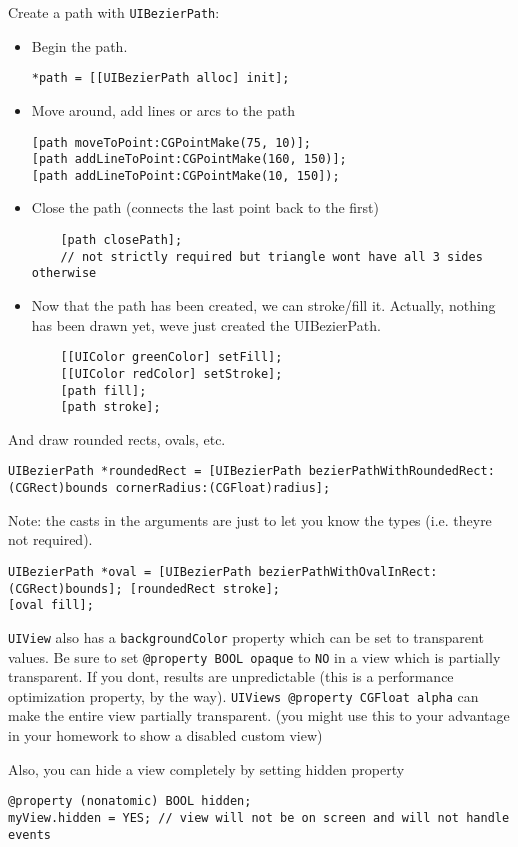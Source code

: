 \documentclass[12pt]{article}
\newcommand{\co}{\texttt}
\begin{document}
Create a path with \co{UIBezierPath}:
\begin{itemize}
	\item Begin the path.
		\begin{lstlisting}
*path = [[UIBezierPath alloc] init];
		\end{lstlisting}
	\item Move around, add lines or arcs to the path
	\begin{lstlisting}
[path moveToPoint:CGPointMake(75, 10)];
[path addLineToPoint:CGPointMake(160, 150)];
[path addLineToPoint:CGPointMake(10, 150]);
	\end{lstlisting}
	\item Close the path (connects the last point back to the first) 
	\begin{lstlisting}
	[path closePath]; 
	// not strictly required but triangle wont have all 3 sides otherwise
	\end{lstlisting}
	\item Now that the path has been created, we can stroke/fill it. Actually, nothing has been drawn yet, weve just created the UIBezierPath. 
	\begin{lstlisting}
	[[UIColor greenColor] setFill];
	[[UIColor redColor] setStroke];
	[path fill]; 
	[path stroke];
	\end{lstlisting}
\end{itemize}

And draw rounded rects, ovals, etc.
\begin{lstlisting}
UIBezierPath *roundedRect = [UIBezierPath bezierPathWithRoundedRect:(CGRect)bounds cornerRadius:(CGFloat)radius];
\end{lstlisting}
Note: the casts in the arguments are just to let you know the types (i.e. theyre not required).
\begin{lstlisting}
UIBezierPath *oval = [UIBezierPath bezierPathWithOvalInRect:(CGRect)bounds]; [roundedRect stroke];
[oval fill];
\end{lstlisting}

\co{UIView} also has a \co{backgroundColor} property which can be set to transparent values. Be sure to set \co{@property BOOL opaque} to \co{NO} in a view which is partially transparent.
If you dont, results are unpredictable (this is a performance optimization property, by the way).
\co{UIViews @property CGFloat alpha} can make the entire view partially transparent.
(you might use this to your advantage in your homework to show a disabled custom view)

Also, you can hide a view completely by setting hidden property 
\begin{lstlisting}
@property (nonatomic) BOOL hidden;
myView.hidden = YES; // view will not be on screen and will not handle events
\end{lstlisting}
\end{document}
